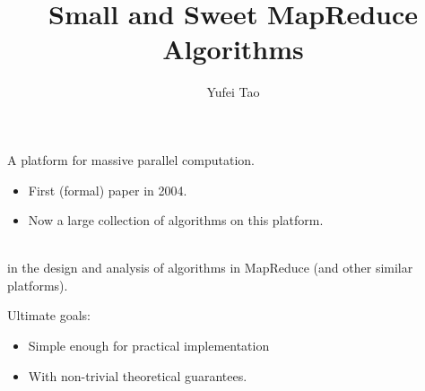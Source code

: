 \documentclass{beamer}
\title{Small and Sweet MapReduce Algorithms}
\author{Yufei Tao}
\institute[]
{Chinese University of Hong Kong}
\date{}
\def\vgap{\vspace{5mm}}
\begin{document}
\begin{frame}
\titlepage
\end{frame}
\begin{frame}
\begin{small}
    
    \vgap 
    
    A platform for massive parallel computation. 
    
    \begin{itemize} 
        \item First (formal) paper in 2004. 
        \item Now a large collection of algorithms on this platform.  
    \end{itemize}
\end{small}
\end{frame}
\begin{frame}
\begin{small}
    
    \vgap 
    
    \begin{tcolorbox}[arc=0mm, colframe=green!50!black, colback=green!10!white] 
         \\
         in the design and analysis of algorithms in MapReduce (and other similar platforms).
    \end{tcolorbox} 
    
    \vgap
    \pause 
    
    Ultimate goals:
    \begin{itemize} 
        \item {} Simple enough for practical implementation 
        \item {} With non-trivial theoretical guarantees. 
    \end{itemize}


\end{small}
\end{frame}
\end{document}
